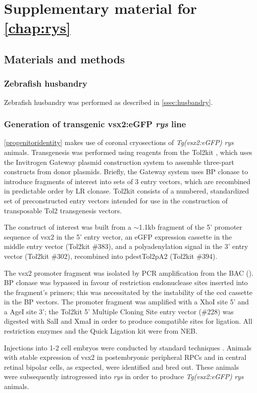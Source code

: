 \chapter{Supplementary material for \autoref{chap:rys}}
\section{Materials and methods}
\subsection{Zebrafish husbandry}
Zebrafish husbandry was performed as described in \autoref{ssec:husbandry}.

\subsection{Generation of transgenic vsx2:eGFP \textit{rys} line}
\autoref{progenitoridentity} makes use of coronal cryosections of \textit{Tg(vsx2:eGFP)} \textit{rys} animals. Transgenesis was performed using reagents from the Tol2kit \cite{Kwan2007}, which uses the Invitrogen Gateway plasmid construction system to assemble three-part constructs from donor plasmids. Briefly, the Gateway system uses BP clonase to introduce fragments of interest into sets of 3 entry vectors, which are recombined in predictable order by LR clonase. Tol2kit consists of a numbered, standardized set of preconstructed entry vectors intended for use in the construction of transposable Tol2 transgenesis vectors.

The construct of interest was built from a $\sim$1.1kb fragment of the 5' promoter sequence of vsx2 in the 5' entry vector, an eGFP expression cassette in the middle entry vector (Tol2kit \#383), and a polyadenylation signal in the 3' entry vector (Tol2kit \#302), recombined into pdestTol2pA2 (Tol2kit \#394).

The vsx2 promoter fragment was isolated by PCR amplification from the BAC (). BP clonase was bypassed in favour of restriction endonuclease sites inserted into the fragment's primers; this was necessitated by the instability of the ccd cassette in the BP vectors. The promoter fragment was amplified with a XhoI site 5' and a AgeI site 3'; the Tol2kit 5' Multiple Cloning Site entry vector (\#228) was digested with SalI and XmaI in order to produce compatible sites for ligation. All restriction enzymes and the Quick Ligation kit were from NEB.

Injections into 1-2 cell embryos were conducted by standard techniques \cite{Westerfield2000}. Animals with stable expression of vsx2 in postembryonic peripheral RPCs and in central retinal bipolar cells, as expected, were identified and bred out. These animals were subsequently introgressed into \textit{rys} in order to produce \textit{Tg(vsx2:eGFP)} \textit{rys} animals.

